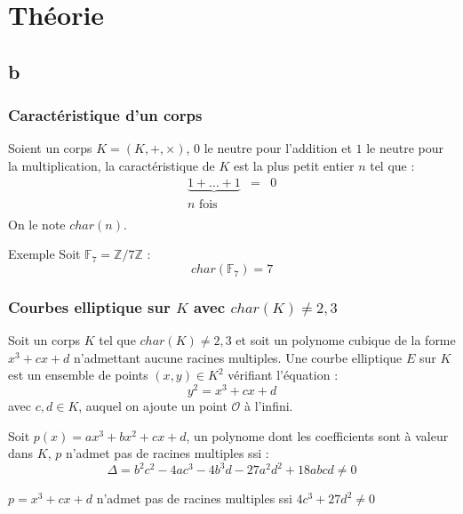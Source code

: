 \documentclass[9pt]{beamer}
\begin{document}
\section{Théorie}

\subsection*{b}

\begin{frame}
    \frametitle{Caractéristique d'un corps}
    \begin{df}
        Soient un corps $K = (K, +, \times)$, $0$ le neutre pour l'addition et $1$ le neutre pour la
        multiplication, la caractéristique de $K$ est la plus petit entier $n$ tel que :
        \[
            \begin{array}{ccc}
                \underbrace{1 + \dots + 1} & = & 0 \\
                n \mbox{ fois} & & \\
            \end{array}
        \]
        On le note $char(n)$.
    \end{df}
    \begin{exampleblock}{Exemple}
        Soit $\mathbb{F}_7 = \mathbb{Z}/7\mathbb{Z}$ : 
        \[ char(\mathbb{F}_7) = 7 \]
    \end{exampleblock}
\end{frame}

\begin{frame}
    \frametitle{Courbes elliptique sur $K$ avec $char(K) \neq 2,3$}
    \begin{df}
        Soit un corps $K$ tel que $char(K) \neq 2, 3$ et soit un polynome cubique de la forme $x^3 +
        cx + d$ n'admettant aucune racines multiples. Une courbe elliptique $E$ sur $K$ est un
        ensemble de points $(x,y) \in K^2$ vérifiant l'équation :
        \[
            y^2 = x^3 + cx + d
        \]
        avec $c, d \in K$, auquel on ajoute un point $\mathcal{O}$ à l'infini.
    \end{df}

    \begin{thrm}
        Soit $p(x) = ax^3 + bx^2 + cx + d$, un polynome dont les coefficients sont à valeur dans $K$, $p$ n'admet pas de
        racines multiples ssi : \[
            \Delta =  b^2c^2 - 4ac^3 - 4b^3d - 27a^2d^2 + 18abcd \neq 0
        \]
    \end{thrm}
    \begin{corol}
        $p = x^3 + cx + d$ n'admet pas de racines multiples ssi $4c^3 + 27d^2 \neq 0$
    \end{corol}
\end{frame}
\end{document}
